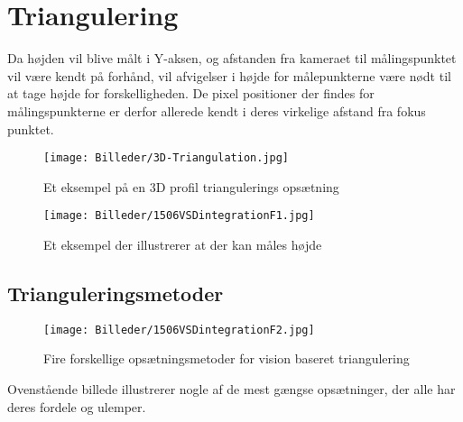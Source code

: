 \section{Triangulering\label{triangulering}}

Da højden vil blive målt i Y-aksen, og afstanden fra kameraet til målingspunktet vil være kendt på forhånd, vil afvigelser i højde for målepunkterne være nødt til at tage højde for forskelligheden.
De pixel positioner der findes for målingspunkterne er derfor allerede kendt i deres virkelige afstand fra fokus punktet.

\begin{figure}[!ht]
  \centering
    \texttt{[image: Billeder/3D-Triangulation.jpg]}
  \caption{Et eksempel på en 3D profil triangulerings opsætning\label{fig:triangulation1}}
\end{figure}

\begin{figure}[!ht]
  \centering
    \texttt{[image: Billeder/1506VSDintegrationF1.jpg]}
  \caption{Et eksempel der illustrerer at der kan måles højde\label{fig:triangulation2}}
\end{figure}

\subsection{Trianguleringsmetoder}

\begin{figure}[!ht]
  \centering
    \texttt{[image: Billeder/1506VSDintegrationF2.jpg]}
  \caption{Fire forskellige opsætningsmetoder for vision baseret triangulering\label{fig:triangulation3}}
\end{figure}

Ovenstående billede illustrerer nogle af de mest gængse opsætninger, der alle har deres fordele og ulemper.




